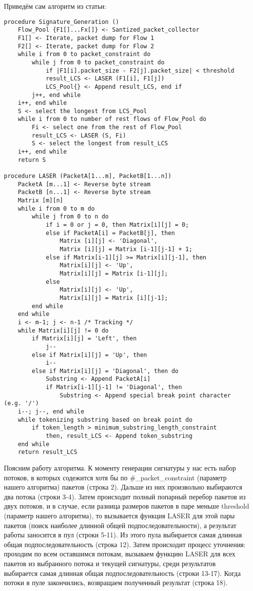 Приведём сам алгоритм из статьи:

\begin{lstlisting}[language=PL/I]
procedure Signature_Generation ()
    Flow_Pool {F1[]...Fx[]} <- Santized_packet_collector
    F1[] <- Iterate, packet dump for Flow 1
    F2[] <- Iterate, packet dump for Flow 2
    while i from 0 to packet_constraint do
        while j from 0 to packet_constraint do
            if |F1[i].packet_size - F2[j].packet_size| < threshold
            result_LCS <- LASER (F1[i], F1[j])
            LCS_Pool{} <- Append result_LCS, end if
        j++, end while
    i++, end while
    S <- select the longest from LCS_Pool
    while i from 0 to number of rest flows of Flow_Pool do
        Fi <- select one from the rest of Flow_Pool
        result_LCS <- LASER (S, Fi)
        S <- select the longest from result_LCS
    i++, end while
    return S

procedure LASER (PacketA[1...m], PacketB[1...n])
    PacketA [m...1] <- Reverse byte stream
    PacketB [n...1] <- Reverse byte stream
    Matrix [m][n]
    while i from 0 to m do
        while j from 0 to n do
            if i = 0 or j = 0, then Matrix[i][j] = 0;
            else if PacketA[i] = PacketB[j], then
                Matrix [i][j] <- 'Diagonal',
                Matrix [i][j] = Matrix [i-1][j-1] + 1;
            else if Matrix[i-1][j] >= Matrix[i][j-1], then
                Matrix[i][j] <- 'Up',
                Matrix[i][j] = Matrix [i-1][j];
            else
                Matrix[i][j] <- 'Up',
                Matrix[i][j] = Matrix [i][j-1];
        end while
    end while
    i <- m-1; j <- n-1 /* Tracking */
    while Matrix[i][j] != 0 do
        if Matrix[i][j] = 'Left', then
            j--
        else if Matrix[i][j] = 'Up', then
            i--
        else if Matrix[i][j] = 'Diagonal', then do
            Substring <- Append PacketA[i]
            if Matrix[i-1][j-1] != 'Diagonal', then
                Substring <- Append special break point character (e.g. '/')
    i--; j--, end while
    while tokenizing substring based on break point do
        if token_length > minimum_substring_length_constraint
            then, result_LCS <- Append token_substring
    end while
    return result_LCS
\end{lstlisting}

Поясним работу алгоритма. К моменту генерации сигнатуры у нас есть набор потоков,
в которых содежится хотя бы по \#\_packet\_constraint (параметр нашего алгоритма) пакетов (строка 2).
Дальше из них произвольно выбираются два потока (строки 3-4). Затем происходит полный попарный перебор пакетов из двух потоков,
и в случае, если разница размеров пакетов в паре меньше threshold (параметр нашего алгоритма),
то вызывается функция LASER для этой пары пакетов (поиск наиболее длинной общей подпоследовательности),
а результат работы заносится в пул (строки 5-11).
Из этого пула выбирается самая длинная общая подпоследовательность (строка 12).
Затем происходит процесс уточнения: проходим по всем оставшимся потокам, вызываем функцию LASER для всех пакетов из выбранного потока и текущей сигнатуры,
среди результатов выбирается самая длинная общая подпоследовательность (строки 13-17). Когда потоки в пуле закончились, возвращаем полученный результат (строка 18).

